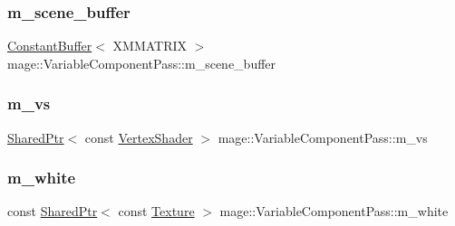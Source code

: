 \hypertarget{classmage_1_1_variable_component_pass_aea22dab8a860f5b3cfa85ee38bc39190}{}\label{classmage_1_1_variable_component_pass_aea22dab8a860f5b3cfa85ee38bc39190} 
\subsubsection{\texorpdfstring{m\+\_\+scene\+\_\+buffer}{m\_scene\_buffer}}
{\footnotesize\ttfamily \hyperlink{structmage_1_1_constant_buffer}{Constant\+Buffer}$<$ X\+M\+M\+A\+T\+R\+IX $>$ mage\+::\+Variable\+Component\+Pass\+::m\+\_\+scene\+\_\+buffer\hspace{0.3cm}{\ttfamily [private]}}

\hypertarget{classmage_1_1_variable_component_pass_afc290392240d6e9af2ba3027b992f53d}{}\label{classmage_1_1_variable_component_pass_afc290392240d6e9af2ba3027b992f53d} 
\subsubsection{\texorpdfstring{m\+\_\+vs}{m\_vs}}
{\footnotesize\ttfamily \hyperlink{namespacemage_a1e01ae66713838a7a67d30e44c67703e}{Shared\+Ptr}$<$ const \hyperlink{classmage_1_1_vertex_shader}{Vertex\+Shader} $>$ mage\+::\+Variable\+Component\+Pass\+::m\+\_\+vs\hspace{0.3cm}{\ttfamily [private]}}

\hypertarget{classmage_1_1_variable_component_pass_a2b018f6481e6e5aa043223ce6821725d}{}\label{classmage_1_1_variable_component_pass_a2b018f6481e6e5aa043223ce6821725d} 
\subsubsection{\texorpdfstring{m\+\_\+white}{m\_white}}
{\footnotesize\ttfamily const \hyperlink{namespacemage_a1e01ae66713838a7a67d30e44c67703e}{Shared\+Ptr}$<$ const \hyperlink{classmage_1_1_texture}{Texture} $>$ mage\+::\+Variable\+Component\+Pass\+::m\+\_\+white\hspace{0.3cm}{\ttfamily [private]}}

